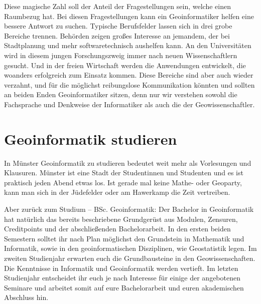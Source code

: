 Diese magische Zahl soll der Anteil der Fragestellungen sein, welche einen Raumbezug hat. Bei diesen Fragestellungen kann ein Geoinformatiker helfen eine bessere Antwort zu suchen. Typische Berufsfelder lassen sich in drei grobe Bereiche trennen. Behörden zeigen großes Interesse an jemandem, der bei Stadtplanung und mehr softwaretechnisch aushelfen kann. An den Universitäten wird in diesem jungen Forschungszweig immer nach neuen Wissenschaftlern gesucht. Und in der freien Wirtschaft werden die Anwendungen entwickelt, die woanders erfolgreich zum Einsatz kommen. Diese Bereiche sind aber auch wieder verzahnt, und für die möglichst reibungslose Kommunikation könnten und sollten an beiden Enden Geoinformatiker sitzen, denn nur wir verstehen sowohl die Fachsprache und Denkweise der Informatiker als auch die der Geowissenschaftler.

\section*{Geoinformatik studieren}
In Münster Geoinformatik zu studieren bedeutet weit mehr als Vorlesungen und Klausuren. Münster ist eine Stadt der Studentinnen und Studenten und es ist praktisch jeden Abend etwas los. Ist gerade mal keine Mathe- oder Geoparty, kann man sich in der Jüdefelder oder am Hawerkamp die Zeit vertreiben.

Aber zurück zum Studium – BSc. Geoinformatik: Der Bachelor in Geoinformatik hat natürlich das bereits beschriebene Grundgerüst aus Modulen, Zensuren, Creditpoints und der abschließenden Bachelorarbeit. In den ersten beiden Semestern solltet ihr nach Plan möglichst den Grundstein in Mathematik und Informatik, sowie in den geoinformatischen Disziplinen, wie Geostatistik legen. Im zweiten Studienjahr erwarten euch die Grundbausteine in den Geowissenschaften. Die Kenntnisse in Informatik und Geoinformatik werden vertieft. Im letzten Studienjahr entscheidet ihr euch je nach Interesse für einige der angebotenen Seminare und arbeitet somit auf eure Bachelorarbeit und euren akademischen Abschluss hin.

